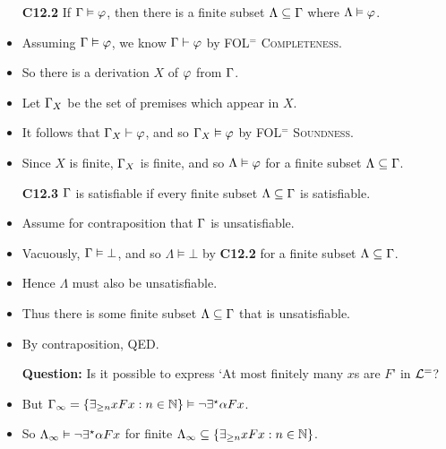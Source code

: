 \documentclass[a4paper, 11pt]{article} %
\begin{document}
\begin{itemize}
  \item[\bf C12.2] If $\Gamma\vDash\varphi$, then there is a finite subset $\Lambda\subseteq\Gamma$ where $\Lambda\vDash\varphi$.
    \item Assuming $\Gamma\vDash\varphi$, we know $\Gamma\vdash\varphi$ by \textsc{FOL$^=$ Completeness}.
    \item So there is a derivation $X$ of $\varphi$ from $\Gamma$.
    \item Let $\Gamma_X$ be the set of premises which appear in $X$.
    \item It follows that $\Gamma_X\vdash\varphi$, and so $\Gamma_X\vDash\varphi$ by \textsc{FOL$^=$ Soundness}.
    \item Since $X$ is finite, $\Gamma_X$ is finite, and so $\Lambda\vDash\varphi$ for a finite subset $\Lambda\subseteq\Gamma$.
  \item[\bf C12.3] $\Gamma$ is satisfiable if every finite subset $\Lambda\subseteq\Gamma$ is satisfiable.
    \item Assume for contraposition that $\Gamma$ is unsatisfiable. 
    \item Vacuously, $\Gamma\vDash\bot$, and so $\Lambda\vDash\bot$ by \textbf{C12.2} for a finite subset $\Lambda\subseteq\Gamma$.
    \item Hence $\Lambda$ must also be unsatisfiable.
    \item Thus there is some finite subset $\Lambda\subseteq\Gamma$ that is unsatisfiable. 
    \item By contraposition, QED.
  \item[\bf Question:] Is it possible to express `At most finitely many $x$s are $F$' in $\mathcal{L}^=$? 
    \item But $\Gamma_\infty=\lbrace\exists_{\geq n}xFx:n\in\mathbb{N}\rbrace \vDash \neg \exists^\star \alpha Fx$.
    \item So $\Lambda_\infty \vDash \neg \exists^\star \alpha Fx$ for finite $\Lambda_\infty \subseteq \lbrace\exists_{\geq n}xFx:n\in\mathbb{N}\rbrace$.
\end{itemize}
\end{document}
